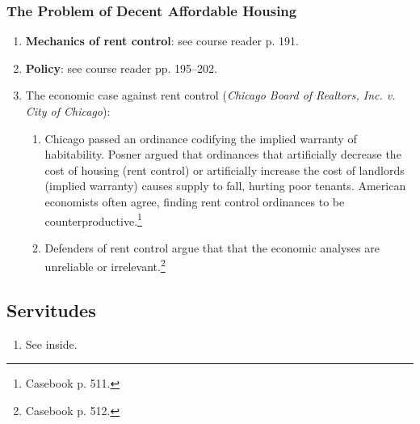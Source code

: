 \subsubsection{The Problem of Decent Affordable Housing}

\begin{enumerate}
    \item \textbf{Mechanics of rent control}: see course reader p. 191.
    \item \textbf{Policy}: see course reader pp. 195--202.
    \item The economic case against rent control (\emph{Chicago Board of 
    Realtors, Inc. v. City of Chicago}):
    \begin{enumerate}
        \item Chicago passed an ordinance codifying the implied warranty of 
        habitability. Posner argued that ordinances that artificially decrease 
        the cost of housing (rent control) or artificially increase the cost 
        of landlords (implied warranty) causes supply to fall, hurting poor 
        tenants. American economists often agree, finding rent control 
        ordinances to be counterproductive.\footnote{Casebook p. 511.}
        \item Defenders of rent control argue that that the economic analyses 
        are unreliable or irrelevant.\footnote{Casebook p. 512.}
    \end{enumerate}
\end{enumerate}

\subsection{Servitudes}

\begin{enumerate}
    \item See inside.
\end{enumerate}
